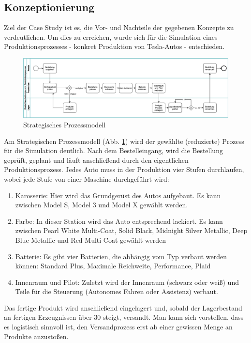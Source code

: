 \subsection{Konzeptionierung}
Ziel der Case Study ist es, die Vor- und Nachteile der gegebenen Konzepte zu verdeutlichen.
Um dies zu erreichen, wurde sich für die Simulation eines Produktionsprozesses - konkret Produktion von Tesla-Autos - entschieden.
\begin{figure}[H]
    \centering
    \includegraphics[width=\textwidth]{ausarbeitung-latex/img/Prozessmodell.png}
    \caption{Strategisches Prozessmodell}
    \label{fig:bpmn}
\end{figure}
Am Strategischen Prozessmodell (Abb. \ref{fig:bpmn}) wird der gewählte (reduzierte) Prozess für die Simulation deutlich. Nach dem Bestelleingang, wird die Bestellung geprüft, geplant und läuft anschließend durch den eigentlichen Produktionsprozess. Jedes Auto muss in der Produktion vier Stufen durchlaufen, wobei jede Stufe von einer Maschine durchgeführt wird:
\begin{enumerate}
    \item Karosserie: Hier wird das Grundgerüst des Autos aufgebaut. Es kann zwischen Model S, Model 3 und Model X gewählt werden.
    \item Farbe: In dieser Station wird das Auto entsprechend lackiert. Es kann zwischen Pearl White Multi-Coat, Solid Black, Midnight Silver Metallic, Deep Blue Metallic und Red Multi-Coat gewählt werden
    \item Batterie: Es gibt vier Batterien, die abhängig vom Typ verbaut werden können: Standard Plus, Maximale Reichweite, Performance, Plaid
    \item Innenraum und Pilot: Zuletzt wird der Innenraum (schwarz oder weiß) und Teile für die Steuerung (Autonomes Fahren oder Assistenz) verbaut.
\end{enumerate} 
Das fertige Produkt wird anschließend eingelagert und, sobald der Lagerbestand an fertigen Erzeugnissen über 30 steigt, versandt. Man kann sich vorstellen, dass es logistisch sinnvoll ist, den Versandprozess erst ab einer gewissen Menge an Produkte anzustoßen.

